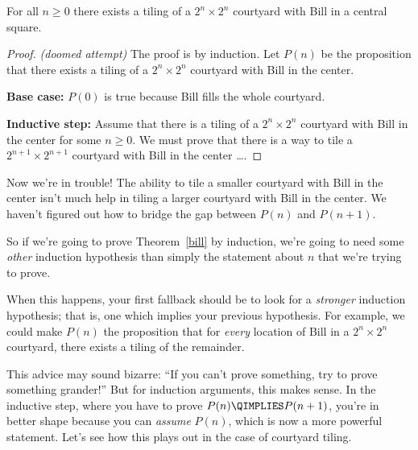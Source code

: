 \begin{theorem}\label{bill}
For all $n \geq 0$ there exists a tiling of a $2^n \times 2^n$
courtyard with Bill in a central square.
\end{theorem}

\begin{proof}
{\em (doomed attempt)} The proof is by induction.  Let $P(n)$ be the
proposition that there exists a tiling of a $2^n \times 2^n$ courtyard
with Bill in the center.

\textbf{Base case:} $P(0)$ is true because Bill fills the whole courtyard.

\textbf{Inductive step:} Assume that there is a tiling of a
$2^n \times 2^n$ courtyard with Bill in the center for some $n \geq
0$.  We must prove that there is a way to tile a $2^{n+1} \times
2^{n+1}$ courtyard with Bill in the center \dots.
\end{proof}

Now we're in trouble!  The ability to tile a smaller courtyard with Bill
in the center isn't much help in tiling a larger courtyard with Bill in
the center.  We haven't figured out how to bridge the gap between $P(n)$
and $P(n+1)$.

So if we're going to prove Theorem~\ref{bill} by induction, we're going to
need some \emph{other} induction hypothesis than simply the statement
about $n$ that we're trying to prove.





When this happens, your first fallback should be to look for a
\emph{stronger} induction hypothesis; that is, one which implies
your previous hypothesis.  For example, we could make $P(n)$ the
proposition that for \emph{every} location of Bill in a $2^n \times
2^n$ courtyard, there exists a tiling of the remainder.

This advice may sound bizarre: ``If you can't prove something, try to
prove something grander!''  But for induction arguments, this makes sense.
In the inductive step, where you have to prove $P(n) \QIMPLIES P(n+1)$,
you're in better shape because you can {\em assume} $P(n)$, which is now a
more powerful statement.  Let's see how this plays out in the case of
courtyard tiling.


